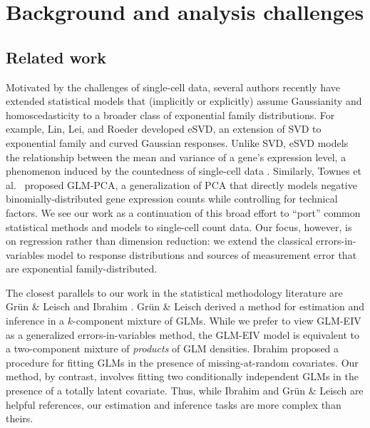 \documentclass[12pt]{article}
\begin{document}
\section{Background and analysis challenges}

\subsection{Related work}

Motivated by the challenges of single-cell data, several authors recently have extended statistical models that (implicitly or explicitly) assume Gaussianity and homoscedasticity to a broader class of exponential family distributions. For example, Lin, Lei, and Roeder \cite{Lin2021} developed eSVD, an extension of SVD to exponential family and curved Gaussian responses. Unlike SVD, eSVD models the relationship between the mean and variance of a gene's expression level, a phenomenon induced by the countedness of single-cell data \cite{Lause2021}.
Similarly, Townes et al.\ \cite{Townes2019} proposed GLM-PCA, a generalization of PCA that directly models negative binomially-distributed gene expression counts while controlling for technical factors. We see our work as a continuation of this broad effort to ``port'' common statistical methods and models to single-cell count data. Our focus, however, is on regression rather than dimension reduction: we extend the classical errors-in-variables model to response distributions and sources of measurement error that are exponential family-distributed.

The closest parallels to our work in the statistical methodology literature are Gr\"{u}n \& Leisch \cite{Grun2008} and Ibrahim \cite{Ibrahim1990}. Gr\"{u}n \& Leisch derived a method for estimation and inference in a $k$-component mixture of GLMs. While we prefer to view GLM-EIV as a generalized errors-in-variables method,  the GLM-EIV model is equivalent to a two-component mixture of \textit{products} of GLM densities. Ibrahim proposed a procedure for fitting GLMs in the presence of missing-at-random covariates. Our method, by contrast, involves fitting two conditionally independent GLMs in the presence of a totally latent covariate. Thus, while Ibrahim and Gr\"{u}n \& Leisch are helpful references, our estimation and inference tasks are more complex than theirs.
\end{document}
